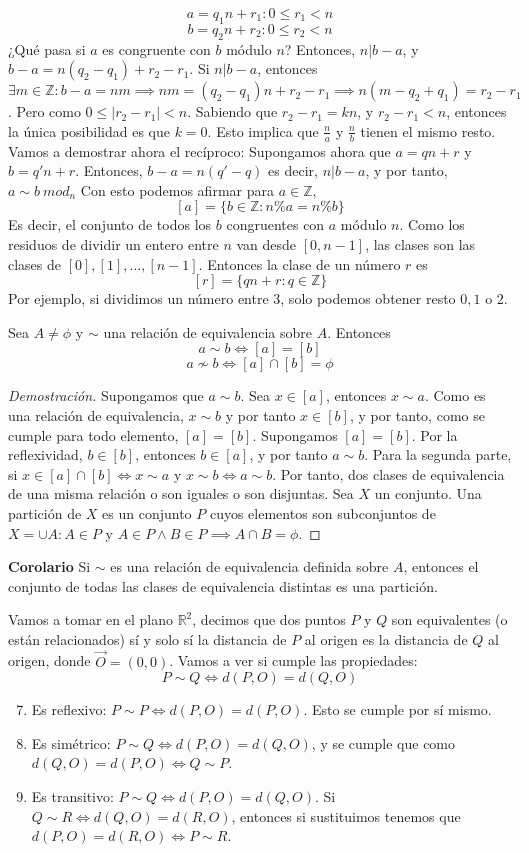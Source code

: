 \documentclass{../Topologia.tex}
\begin{document}
$$
a = q_{1}n+r_{1}:0\leq r_{1}<n
$$
$$
b=q_{2}n+r_{2}:0\leq r_{2}<n
$$
¿Qué pasa si $a$ es congruente con $b$ módulo $n$?
Entonces, $n |b-a$, y $b-a=n(q_{2}-q_{1}) +r_{2}-r_{1}$. Si $n|b-a$, entonces $\exists m \in \mathbb{Z}: b-a=nm \implies nm=(q_{2}-q_{1})n+r_{2}-r_{1}\implies n(m-q_{2}+q_{1})=r_{2}-r_{1}$.
Pero como $0\leq|r_{2}-r_{1}|<n$. Sabiendo que $r_{2}-r_{1} = kn$, y $r_{2}-r_{1} < n$, entonces la única posibilidad es que $k=0$. Esto implica que $\frac{n}{a}$ y $\frac{n}{b}$ tienen el mismo resto.
Vamos a demostrar ahora el recíproco:
Supongamos ahora que $a = qn+r$ y $b=q'n+r$. Entonces, $b-a = n(q'-q)$ es decir, $n|b-a$, y por tanto, $a \sim b~mod_{n}$
Con esto podemos afirmar para $a\in \mathbb{Z}$,
$$
[a] = \{ b \in \mathbb{Z}:n\%a=n\%b \}
$$
Es decir, el conjunto de todos los $b$ congruentes con $a$ módulo $n$. Como los residuos de dividir un entero entre $n$ van desde $[0,n-1]$, las clases son las clases de $[0],[1],\dots,[n-1]$. Entonces la clase de un número $r$ es
$$
[r]= \{ qn+r:q\in \mathbb{Z} \}
$$
Por ejemplo, si dividimos un número entre $3$, solo podemos obtener resto $0,1$ o $2$.

\begin{teorema}
Sea $A \neq \phi$ y $\sim$ una relación de equivalencia sobre $A$. Entonces
$$
a\sim b\iff[a]=[b]
$$
$$
a\not\sim b \iff [a] \cap  [b]=\phi
$$
\end{teorema}
\begin{proof}[Demostración]
Supongamos que $a\sim b$. Sea $x \in[a]$, entonces $x\sim a$. Como es una relación de equivalencia, $x\sim b$ y por tanto $x \in [b]$, y por tanto, como se cumple para todo elemento, $[a]=[b]$.
Supongamos $[a]=[b]$. Por la reflexividad, $b\in[b]$, entonces $b\in[a]$, y por tanto $a\sim b$.
Para la segunda parte, si $x \in[a]\cap[b]\iff x\sim a$ y $x\sim b\iff a\sim b$. Por tanto, dos clases de equivalencia de una misma relación o son iguales o son disjuntas.
Sea $X$ un conjunto. Una partición de $X$ es un conjunto $P$ cuyos elementos son subconjuntos de $X= \cup A : A \in P$ y $A \in P \wedge B \in P \implies A \cap B = \phi$.
\end{proof}
\textbf{Corolario}
Si $\sim$ es una relación de equivalencia definida sobre $A$, entonces el conjunto de todas las clases de equivalencia distintas es una partición.

\vspace{1em}
Vamos a tomar en el plano $\mathbb{R}^2$, decimos que dos puntos $P$ y $Q$ son equivalentes (o están relacionados) sí y solo sí la distancia de $P$ al origen es la distancia de $Q$ al origen, donde $\vec{O} = (0,0)$. Vamos a ver si cumple las propiedades:
$$
P \sim Q \iff d(P,O)=d(Q,O)
$$
\begin{enumerate}
\setcounter{enumi}{6}
    \item Es reflexivo: $P \sim P \iff d(P,O) = d(P,O)$. Esto se cumple por sí mismo.
    \item Es simétrico: $P\sim Q \iff d(P,O) = d(Q,O)$, y se cumple que como $d(Q,O)=d(P,O) \iff Q\sim P$.
    \item Es transitivo: $P\sim Q \iff d(P,O) = d(Q,O)$. Si $Q\sim R \iff d(Q,O) = d(R,O)$, entonces si sustituimos tenemos que $d(P,O)=d(R,O) \iff P \sim R$.
\end{enumerate}
\end{document}
